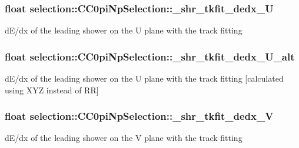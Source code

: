 \subsubsection[{\texorpdfstring{\+\_\+shr\+\_\+tkfit\+\_\+dedx\+\_\+U}{_shr_tkfit_dedx_U}}]{\setlength{\rightskip}{0pt plus 5cm}float selection\+::\+C\+C0pi\+Np\+Selection\+::\+\_\+shr\+\_\+tkfit\+\_\+dedx\+\_\+U\hspace{0.3cm}{\ttfamily [private]}}\hypertarget{classselection_1_1CC0piNpSelection_aaaef69409457695e2300bf847a13804c}{}\label{classselection_1_1CC0piNpSelection_aaaef69409457695e2300bf847a13804c}
d\+E/dx of the leading shower on the U plane with the track fitting 
\subsubsection[{\texorpdfstring{\+\_\+shr\+\_\+tkfit\+\_\+dedx\+\_\+\+U\+\_\+alt}{_shr_tkfit_dedx_U_alt}}]{\setlength{\rightskip}{0pt plus 5cm}float selection\+::\+C\+C0pi\+Np\+Selection\+::\+\_\+shr\+\_\+tkfit\+\_\+dedx\+\_\+\+U\+\_\+alt\hspace{0.3cm}{\ttfamily [private]}}\hypertarget{classselection_1_1CC0piNpSelection_af4cca20b2f900cbff5390127a05b6f9d}{}\label{classselection_1_1CC0piNpSelection_af4cca20b2f900cbff5390127a05b6f9d}
d\+E/dx of the leading shower on the U plane with the track fitting \mbox{[}calculated using X\+YZ instead of RR\mbox{]} 
\subsubsection[{\texorpdfstring{\+\_\+shr\+\_\+tkfit\+\_\+dedx\+\_\+V}{_shr_tkfit_dedx_V}}]{\setlength{\rightskip}{0pt plus 5cm}float selection\+::\+C\+C0pi\+Np\+Selection\+::\+\_\+shr\+\_\+tkfit\+\_\+dedx\+\_\+V\hspace{0.3cm}{\ttfamily [private]}}\hypertarget{classselection_1_1CC0piNpSelection_a428fc549513bea0e1ca92cf90c1148cd}{}\label{classselection_1_1CC0piNpSelection_a428fc549513bea0e1ca92cf90c1148cd}
d\+E/dx of the leading shower on the V plane with the track fitting 
